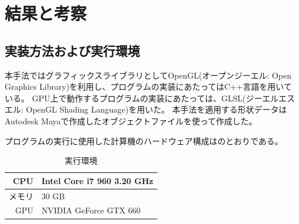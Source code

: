 \chapter{結果と考察}
\label{CResult}


\section{実装方法および実行環境}
\label{SEnvironment}

本手法ではグラフィックスライブラリとしてOpenGL(オープンジーエル: Open Graphics Library)を利用し、プログラムの実装にあたってはC++言語を用いている。
GPU上で動作するプログラムの実装にあたっては、GLSL(ジーエルエスエル: OpenGL Shading Language)を用いた。
本手法を適用する形状データはAutodesk Mayaで作成したオブジェクトファイルを使って作成した。

プログラムの実行に使用した計算機のハードウェア構成はのとおりである。

\begin{table}
\centering
\caption{実行環境 \label{tab:experiment-hadrware}}
\begin{tabular}{r|l}
\hline
CPU & Intel Core i7 960 3.20 GHz \\ \hline
メモリ & 30 GB \\ \hline
GPU & NVIDIA GeForce GTX 660 \\ \hline
\end{tabular}
\end{table}


